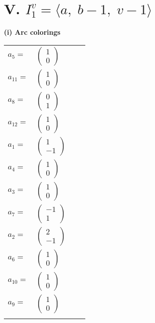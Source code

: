 \documentclass[1p]{elsarticle_modified}
\theoremstyle{definition}
\begin{document}
\centering \section*{V. $I^v_{1}= \langle a,\;b-1,\;v-1 \rangle$}
\flushleft \textbf{(i) Arc colorings}\\
\begin{tabular}{m{7pt} m{180pt} m{7pt} m{180pt} }
\flushright $a_{5}=$&$\begin{pmatrix}1\\0\end{pmatrix}$ \\
\flushright $a_{11}=$&$\begin{pmatrix}1\\0\end{pmatrix}$ \\
\flushright $a_{8}=$&$\begin{pmatrix}0\\1\end{pmatrix}$ \\
\flushright $a_{12}=$&$\begin{pmatrix}1\\0\end{pmatrix}$ \\
\flushright $a_{1}=$&$\begin{pmatrix}1\\-1\end{pmatrix}$ \\
\flushright $a_{4}=$&$\begin{pmatrix}1\\0\end{pmatrix}$ \\
\flushright $a_{3}=$&$\begin{pmatrix}1\\0\end{pmatrix}$ \\
\flushright $a_{7}=$&$\begin{pmatrix}-1\\1\end{pmatrix}$ \\
\flushright $a_{2}=$&$\begin{pmatrix}2\\-1\end{pmatrix}$ \\
\flushright $a_{6}=$&$\begin{pmatrix}1\\0\end{pmatrix}$ \\
\flushright $a_{10}=$&$\begin{pmatrix}1\\0\end{pmatrix}$ \\
\flushright $a_{9}=$&$\begin{pmatrix}1\\0\end{pmatrix}$\\&\end{tabular}
\end{document}
